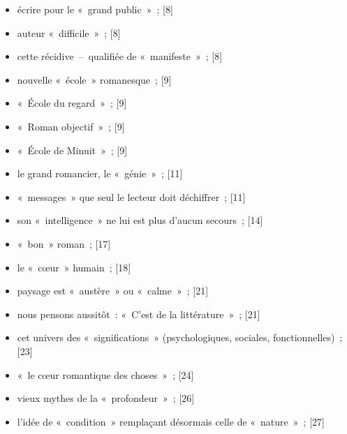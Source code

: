 \documentclass[12pt, a4paper]{article}
\begin{document}
\begin{itemize}

    \item écrire pour le «~grand public~»{\color{gray}~; [8]}

    \item auteur «~difficile~»{\color{gray}~; [8]}

    \item cette récidive~–~qualifiée de «~manifeste~»{\color{gray}~; [8]}

    \item nouvelle «~école~» romanesque{\color{gray}~; [9]}

    \item «~École du regard~»{\color{gray}~; [9]}

    \item «~Roman objectif~»{\color{gray}~; [9]}

    \item «~École de Minuit~»{\color{gray}~; [9]}

    \item le grand romancier, le «~génie~»{\color{gray}~; [11]}

    \item «~messages~» que seul le lecteur doit déchiffrer{\color{gray}~; [11]}

    \item son «~intelligence~» ne lui est plus d’aucun secours{\color{gray}~; [14]}

    \item «~bon~» roman{\color{gray}~; [17]}

    \item le «~cœur~» humain{\color{gray}~; [18]}

    \item paysage est «~austère~» ou «~calme~»{\color{gray}~; [21]}

    \item nous pensons aussitôt~: «~C’est de la littérature~»{\color{gray}~; [21]}

    \item cet univers des «~significations~» (psychologiques, sociales, fonctionnelles){\color{gray}~; [23]}

    \item «~le cœur romantique des choses~»{\color{gray}~; [24]}

    \item vieux mythes de la «~profondeur~»{\color{gray}~; [26]}

    \item  l’idée de «~condition~» remplaçant désormais celle de «~nature~»{\color{gray}~; [27]}


\end{itemize}
\end{document}
